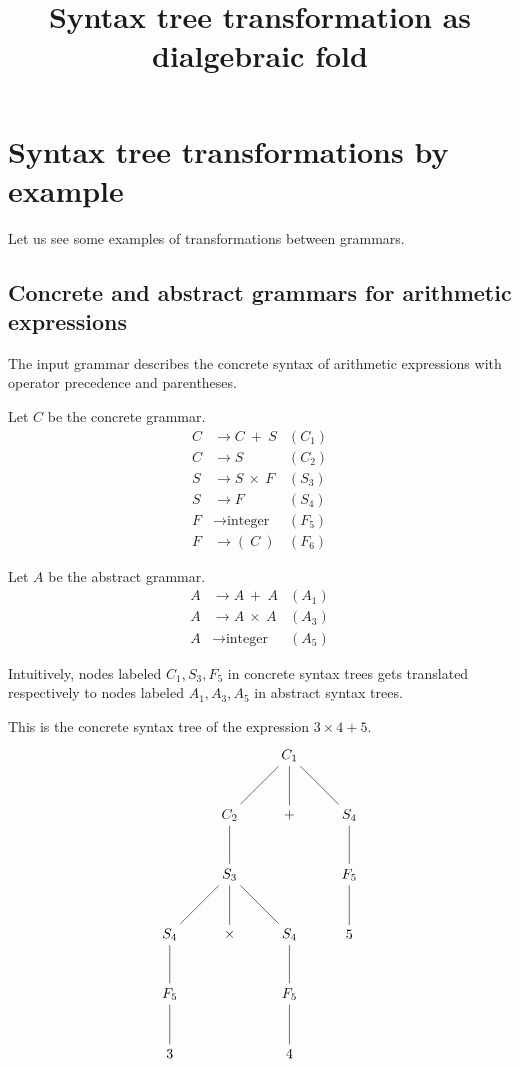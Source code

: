 \documentclass{amsart}
\gdef\R{\rightarrow}
\begin{document}
\null
{}
\title{Syntax tree transformation as dialgebraic fold}
\maketitle
{}

\section{Syntax tree transformations by example}

Let us see some examples of transformations between grammars.

\subsection{Concrete and abstract grammars for arithmetic expressions}

The input grammar describes the concrete syntax of arithmetic
expressions with operator precedence and parentheses.

Let $C$ be the concrete grammar.
\begin{align*}
C &\R C~+~S & (C_1) \\
C &\R S     & (C_2) \\
S &\R S~\times~F & (S_3) \\
S &\R F     & (S_4) \\
F &\R \mbox{integer} & (F_5) \\
F &\R (~C~) & (F_6)
\end{align*}

Let $A$ be the abstract grammar.
\begin{align*}
A &\R A~+~A & (A_1) \\
A &\R A~\times~A & (A_3) \\
A &\R \mbox{integer} & (A_5)
\end{align*}

Intuitively, nodes labeled $C_1,S_3,F_5$ in concrete syntax trees
gets translated respectively to nodes labeled $A_1,A_3,A_5$ in
abstract syntax trees.

This is the concrete syntax tree of the expression $3\times4+5$.
\[
\begin{tikzpicture}
\path node{$C_1$}
child { node{$C_2$}
  child { node{$S_3$}
    child { node{$S_4$} child { node{$F_5$} child { node{$3$} }}}
    child { node{$\times$} }
    child { node{$S_4$} child { node{$F_5$} child { node{$4$} }}}
  }
}
child { node{$+$} }
child{ node{$S_4$} child{ node{$F_5$} child{ node{$5$} }}}
;
\end{tikzpicture}
\]
\end{document}
